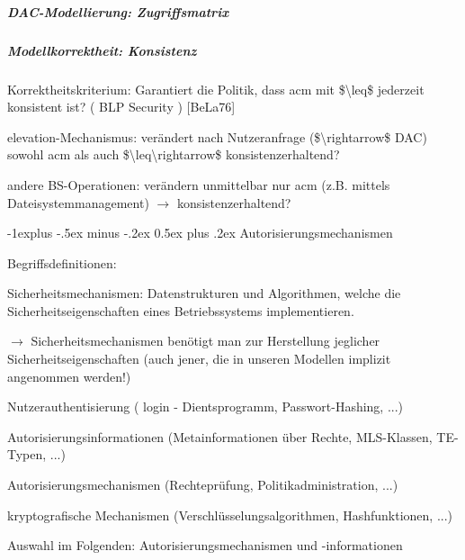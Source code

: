 \documentclass[a4paper]{article}
\makeatletter
\renewcommand{\subsection}{\@startsection{subsection}{2}{0mm}%
 {-1explus -.5ex minus -.2ex}%
 {0.5ex plus .2ex}%
 {\normalfont\normalsize\bfseries}}
\makeatother
\begin{document}
\begin{multicols}{3}
    \subparagraph{DAC-Modellierung:
        Zugriffsmatrix}



    \subparagraph{Modellkorrektheit:
        Konsistenz}

    \begin{itemize*}
        \item
        Korrektheitskriterium: Garantiert die Politik, dass acm mit
        \$\textbackslash leq\$ jederzeit konsistent ist? ( BLP Security )
        {[}BeLa76{]}
        \item
        elevation-Mechanismus: verändert nach Nutzeranfrage
        (\$\textbackslash rightarrow\$ DAC) sowohl acm als auch
        \$\textbackslash leq\textbackslash rightarrow\$ konsistenzerhaltend?
        \item
        andere BS-Operationen: verändern unmittelbar nur acm (z.B. mittels
        Dateisystemmanagement) $\rightarrow$
        konsistenzerhaltend?
    \end{itemize*}


    \subsection{Autorisierungsmechanismen}

    Begriffsdefinitionen:

    \begin{itemize*}
        \item
        Sicherheitsmechanismen: Datenstrukturen und Algorithmen, welche die
        Sicherheitseigenschaften eines Betriebssystems implementieren.
        \begin{itemize*}
            \item $\rightarrow$  Sicherheitsmechanismen benötigt man zur Herstellung jeglicher Sicherheitseigenschaften (auch jener, die in unseren Modellen implizit angenommen werden!)
            \item Nutzerauthentisierung ( login - Dientsprogramm, Passwort-Hashing, ...)
            \item Autorisierungsinformationen (Metainformationen über Rechte, MLS-Klassen, TE-Typen, ...)
            \item Autorisierungsmechanismen (Rechteprüfung, Politikadministration, ...)
            \item kryptografische Mechanismen (Verschlüsselungsalgorithmen, Hashfunktionen, ...)
        \end{itemize*}
        \item
        Auswahl im Folgenden: Autorisierungsmechanismen und -informationen
    \end{itemize*}



\end{multicols}
\end{document}
